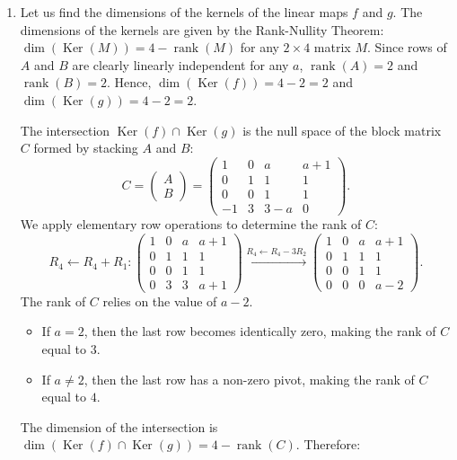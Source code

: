 \documentclass[10pt,a4paper]{article}
\begin{document}
\begin{enumerate}[label=\fbox{\arabic*}]
  \item %
        Let us find the dimensions of the kernels of the linear maps $f$ and $g$. The dimensions of the kernels are given by the Rank-Nullity Theorem: $\dim(\operatorname{Ker}(M)) = 4 - \operatorname{rank}(M)$ for any $2 \times 4$ matrix $M$.
        Since rows of $A$ and $B$ are clearly linearly independent for any $a$, $\operatorname{rank}(A) = 2$ and $\operatorname{rank}(B) = 2$.
        Hence, $\dim(\operatorname{Ker}(f)) = 4 - 2 = 2$ and $\dim(\operatorname{Ker}(g)) = 4 - 2 = 2$.

        The intersection $\operatorname{Ker}(f) \cap \operatorname{Ker}(g)$ is the null space of the block matrix $C$ formed by stacking $A$ and $B$:
        \[
          C = \begin{pmatrix} A \\ B \end{pmatrix} = \begin{pmatrix} 1 & 0 & a & a+1 \\ 0 & 1 & 1 & 1 \\ 0 & 0 & 1 & 1 \\ -1 & 3 & 3-a & 0 \end{pmatrix}.
        \]
        We apply elementary row operations to determine the rank of $C$:
        \[
          R_4 \leftarrow R_4 + R_1 : \begin{pmatrix} 1 & 0 & a & a+1 \\ 0 & 1 & 1 & 1 \\ 0 & 0 & 1 & 1 \\ 0 & 3 & 3 & a+1 \end{pmatrix} \xrightarrow{R_4 \leftarrow R_4 - 3R_2} \begin{pmatrix} 1 & 0 & a & a+1 \\ 0 & 1 & 1 & 1 \\ 0 & 0 & 1 & 1 \\ 0 & 0 & 0 & a-2 \end{pmatrix}.
        \]
        The rank of $C$ relies on the value of $a - 2$.
        \begin{itemize}
          \item If $a = 2$, then the last row becomes identically zero, making the rank of $C$ equal to $3$.
          \item If $a \neq 2$, then the last row has a non-zero pivot, making the rank of $C$ equal to $4$.
        \end{itemize}
        The dimension of the intersection is $\dim(\operatorname{Ker}(f) \cap \operatorname{Ker}(g)) = 4 - \operatorname{rank}(C)$. Therefore:

\end{enumerate}
\end{document}
